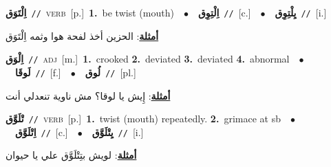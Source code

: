 \documentclass[10pt,a4paper,twoside]{article} %
\begin{document}
\begin{multicols}{2}
{\setlength\topsep{0pt}\textbf{\foreignlanguage{arabic}{اِلْتَوَق}}\ {\color{gray}\texttt{//}\color{black}}\ \textsc{verb}\ [p.]\ \textbf{1.}~be twist (mouth)\ \ $\bullet$\ \ \setlength\topsep{0pt}\textbf{\foreignlanguage{arabic}{اِلْتِوِق}}\ {\color{gray}\texttt{//}\color{black}}\ [c.]\ \ $\bullet$\ \ \setlength\topsep{0pt}\textbf{\foreignlanguage{arabic}{يِلْتِوِق}}\ {\color{gray}\texttt{//}\color{black}}\ [i.]\  \begin{flushright}\color{gray}\foreignlanguage{arabic}{\textbf{\underline{\foreignlanguage{arabic}{أمثلة}}}: الحزين أخذ لفحة هوا وثمه اِلْتَوَق}\end{flushright}\color{black}} \vspace{2mm}

{\setlength\topsep{0pt}\textbf{\foreignlanguage{arabic}{اِلْوَق}}\ {\color{gray}\texttt{//}\color{black}}\ \textsc{adj}\ [m.]\ \textbf{1.}~crooked  \textbf{2.}~deviated  \textbf{3.}~deviated  \textbf{4.}~abnormal\ \ $\bullet$\ \ \setlength\topsep{0pt}\textbf{\foreignlanguage{arabic}{لَوقَا}}\ {\color{gray}\texttt{//}\color{black}}\ [f.]\ \ $\bullet$\ \ \setlength\topsep{0pt}\textbf{\foreignlanguage{arabic}{لُوق}}\ {\color{gray}\texttt{//}\color{black}}\ [pl.]\  \begin{flushright}\color{gray}\foreignlanguage{arabic}{\textbf{\underline{\foreignlanguage{arabic}{أمثلة}}}: إِيش يا لوقا؟ مش ناوية تنعدلي أنت}\end{flushright}\color{black}} \vspace{2mm}

{\setlength\topsep{0pt}\textbf{\foreignlanguage{arabic}{تْلَوَّق}}\ {\color{gray}\texttt{//}\color{black}}\ \textsc{verb}\ [p.]\ \textbf{1.}~twist (mouth) repeatedly.  \textbf{2.}~grimace at sb\ \ $\bullet$\ \ \setlength\topsep{0pt}\textbf{\foreignlanguage{arabic}{اِتْلَوَّق}}\ {\color{gray}\texttt{//}\color{black}}\ [c.]\ \ $\bullet$\ \ \setlength\topsep{0pt}\textbf{\foreignlanguage{arabic}{يِتْلَوَّق}}\ {\color{gray}\texttt{//}\color{black}}\ [i.]\  \begin{flushright}\color{gray}\foreignlanguage{arabic}{\textbf{\underline{\foreignlanguage{arabic}{أمثلة}}}: لويش بتِتْلَوَّق علي يا حيوان}\end{flushright}\color{black}} \vspace{2mm}


\end{multicols}
\end{document}
